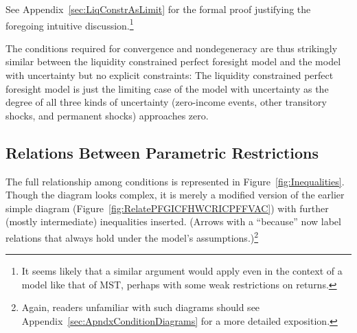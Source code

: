 \documentclass[BufferStockTheory]{subfiles}
\begin{document}
\hypertarget{Factors-Defined-And-Compared}{}


See Appendix~\ref{sec:LiqConstrAsLimit} for the formal proof justifying the foregoing intuitive discussion.\footnote{It seems likely that a similar argument would apply even in the context of a model like that of MST, perhaps with some weak restrictions on returns.}

The conditions required for convergence and nondegeneracy are thus strikingly similar between the liquidity constrained perfect foresight model and the model with uncertainty but no explicit constraints: The liquidity constrained perfect foresight model is just the limiting case of the model with uncertainty as the degree of all three kinds of uncertainty (zero-income events, other transitory shocks, and permanent shocks) approaches zero.



\hypertarget{Relations-Between-Parametric-Restrictions}{}
\subsection{Relations Between Parametric Restrictions}\label{sec:discussConvergence}

The full relationship among conditions is represented in Figure~\ref{fig:Inequalities}.  Though the diagram looks complex, it is merely a modified version of the earlier simple diagram (Figure~\ref{fig:RelatePFGICFHWCRICPFFVAC}) with further (mostly intermediate) inequalities inserted.  (Arrows with a ``because'' now label relations that always hold under the model's assumptions.)\footnote{Again, readers unfamiliar with such diagrams should see Appendix~\ref{sec:ApndxConditionDiagrams} for a more detailed exposition.}

\renewcommand{\figName}{Inequalities} 
\renewcommand{\figFile}{\figName} 
\hypertarget{\figFile}{}

\end{document}
